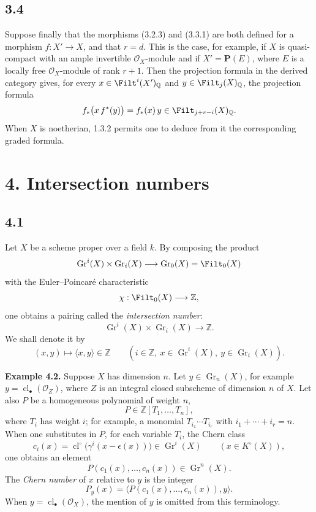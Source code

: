 \documentclass[11pt]{article}
\newcommand{\Gr}{\operatorname{Gr}}
\newcommand{\cl}{\operatorname{cl}}
\providecommand{\Gr}{\operatorname{Gr}}
\providecommand{\Gr}{\operatorname{G}}
\begin{document}
\subsection*{3.4}
Suppose finally that the morphisms (3.2.3) and (3.3.1) are both defined for a morphism \(f:X'\to X\), and that \(r=d\). This is the case, for example, if \(X\) is quasi-compact with an ample invertible \(\mathcal O_X\)-module and if \(X'=\mathbf P(E)\), where \(E\) is a locally free \(\mathcal O_X\)-module of rank \(r+1\). Then the projection formula in the derived category gives, for every \(x\in\Filt^i(X')_{\mathbb Q}\) and \(y\in\Filt_j(X)_{\mathbb Q}\), the projection formula
\[
 f_*\bigl(x\,f^*(y)\bigr)=f_*(x)\,y\in\Filt_{j+r-i}(X)_{\mathbb Q}.
\]
When \(X\) is noetherian, 1.3.2 permits one to deduce from it the corresponding graded formula.

\section*{4. Intersection numbers}

\subsection*{4.1}
Let \(X\) be a scheme proper over a field \(k\). By composing the product
\[
 \Gr^i(X)\times\Gr_i(X)\longrightarrow\Gr_0(X)=\Filt_0(X)
\]
with the Euler--Poincaré characteristic
\[
 \chi:\Filt_0(X)\longrightarrow\mathbb Z,
\]
one obtains a pairing called the \emph{intersection number}:
\begin{equation}\tag{4.1.1}
 \Gr^i(X)\times\Gr_i(X)\longrightarrow \mathbb Z.
\end{equation}
We shall denote it by
\[
 (x,y)\longmapsto \langle x,y\rangle\in\mathbb Z
 \qquad (i\in\mathbb Z,\ x\in\Gr^i(X),\ y\in\Gr_i(X)).
\]

\textbf{Example 4.2.} Suppose \(X\) has dimension \(n\). Let \(y\in\Gr_n(X)\), for example \(y=\cl_\bullet(\mathcal O_Z)\), where \(Z\) is an integral closed subscheme of dimension \(n\) of \(X\). Let also \(P\) be a homogeneous polynomial of weight \(n\),
\[
 P\in\mathbb Z[T_1,\ldots,T_n],
\]
where \(T_i\) has weight \(i\); for example, a monomial \(T_{i_1}\cdots T_{i_r}\) with \(i_1+\cdots+i_r=n\). When one substitutes in \(P\), for each variable \(T_i\), the Chern class
\[
 c_i(x)=\cl^\circ\bigl(\gamma^i(x-\epsilon(x))\bigr)\in\Gr^i(X)
 \qquad (x\in K^\circ(X)),
\]
one obtains an element
\[
 P(c_1(x),\ldots,c_n(x))\in\Gr^n(X).
\]
The \emph{Chern number} of \(x\) relative to \(y\) is the integer
\[
 P_y(x)=\bigl\langle P(c_1(x),\ldots,c_n(x)),y\bigr\rangle.
\]
When \(y=\cl_\bullet(\mathcal O_X)\), the mention of \(y\) is omitted from this terminology.
\end{document}
